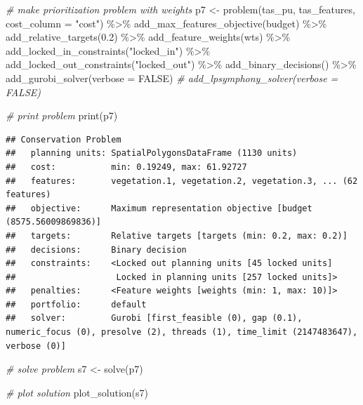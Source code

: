 \documentclass[
  12pt,
]{book}
\newenvironment{Shaded}{\begin{snugshade}}{\end{snugshade}}
\newcommand{\AttributeTok}[1]{\textcolor[rgb]{0.77,0.63,0.00}{#1}}
\newcommand{\CommentTok}[1]{\textcolor[rgb]{0.56,0.35,0.01}{\textit{#1}}}
\newcommand{\ConstantTok}[1]{\textcolor[rgb]{0.00,0.00,0.00}{#1}}
\newcommand{\FloatTok}[1]{\textcolor[rgb]{0.00,0.00,0.81}{#1}}
\newcommand{\FunctionTok}[1]{\textcolor[rgb]{0.00,0.00,0.00}{#1}}
\newcommand{\NormalTok}[1]{#1}
\newcommand{\OtherTok}[1]{\textcolor[rgb]{0.56,0.35,0.01}{#1}}
\newcommand{\SpecialCharTok}[1]{\textcolor[rgb]{0.00,0.00,0.00}{#1}}
\newcommand{\StringTok}[1]{\textcolor[rgb]{0.31,0.60,0.02}{#1}}
\begin{document}
\begin{Shaded}
\begin{Highlighting}[]
\CommentTok{\# make prioritization problem with weights}
\NormalTok{p7 }\OtherTok{\textless{}{-}} \FunctionTok{problem}\NormalTok{(tas\_pu, tas\_features, }\AttributeTok{cost\_column =} \StringTok{"cost"}\NormalTok{) }\SpecialCharTok{\%\textgreater{}\%}
      \FunctionTok{add\_max\_features\_objective}\NormalTok{(budget) }\SpecialCharTok{\%\textgreater{}\%}
      \FunctionTok{add\_relative\_targets}\NormalTok{(}\FloatTok{0.2}\NormalTok{) }\SpecialCharTok{\%\textgreater{}\%}
      \FunctionTok{add\_feature\_weights}\NormalTok{(wts) }\SpecialCharTok{\%\textgreater{}\%}
      \FunctionTok{add\_locked\_in\_constraints}\NormalTok{(}\StringTok{"locked\_in"}\NormalTok{) }\SpecialCharTok{\%\textgreater{}\%}
      \FunctionTok{add\_locked\_out\_constraints}\NormalTok{(}\StringTok{"locked\_out"}\NormalTok{) }\SpecialCharTok{\%\textgreater{}\%}
      \FunctionTok{add\_binary\_decisions}\NormalTok{() }\SpecialCharTok{\%\textgreater{}\%}
       \FunctionTok{add\_gurobi\_solver}\NormalTok{(}\AttributeTok{verbose =} \ConstantTok{FALSE}\NormalTok{)}
      \CommentTok{\# add\_lpsymphony\_solver(verbose = FALSE)}

\CommentTok{\# print problem}
\FunctionTok{print}\NormalTok{(p7)}
\end{Highlighting}
\end{Shaded}

\begin{verbatim}
## Conservation Problem
##   planning units: SpatialPolygonsDataFrame (1130 units)
##   cost:           min: 0.19249, max: 61.92727
##   features:       vegetation.1, vegetation.2, vegetation.3, ... (62 features)
##   objective:      Maximum representation objective [budget (8575.56009869836)]
##   targets:        Relative targets [targets (min: 0.2, max: 0.2)]
##   decisions:      Binary decision 
##   constraints:    <Locked out planning units [45 locked units]
##                    Locked in planning units [257 locked units]>
##   penalties:      <Feature weights [weights (min: 1, max: 10)]>
##   portfolio:      default
##   solver:         Gurobi [first_feasible (0), gap (0.1), numeric_focus (0), presolve (2), threads (1), time_limit (2147483647), verbose (0)]
\end{verbatim}

\begin{Shaded}
\begin{Highlighting}[]
\CommentTok{\# solve problem}
\NormalTok{s7 }\OtherTok{\textless{}{-}} \FunctionTok{solve}\NormalTok{(p7)}

\CommentTok{\# plot solution}
\FunctionTok{plot\_solution}\NormalTok{(s7)}
\end{Highlighting}
\end{Shaded}
\end{document}
